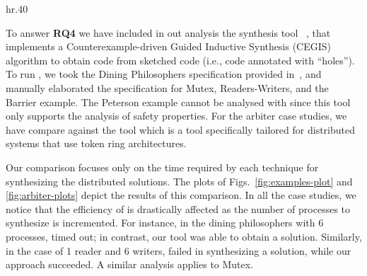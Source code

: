 \begin{wrapfigure}[31]{hr}{.40\textwidth}
\caption{Efficiency comparison for arbiter examples}\label{fig:arbiter-plots}
\end{wrapfigure}
To answer \textbf{RQ4} we have included in out analysis the synthesis tool {\PSketch}~\cite{Solar-Lezama+2008}, that implements a Counterexample-driven Guided Inductive Synthesis (CEGIS) algorithm to obtain code from sketched code (i.e., code annotated with ``holes''). To run {\PSketch}, we took the Dining Philosophers specification provided in~\cite{Solar-Lezama+2008}, and manually elaborated the specification for Mutex,  Readers-Writers, and the Barrier example.  The Peterson example cannot be analysed with  {\PSketch} since this tool only supports the analysis of safety properties.  For the arbiter case studies, we have compare against the tool {\Party} \cite{Party} which is a tool specifically tailored for distributed systems that use token ring architectures.

Our comparison focuses only on the time required by each technique for synthesizing the distributed solutions. The plots of Figs.~\ref{fig:examples-plot} and \ref{fig:arbiter-plots} depict the results of this comparison. In all the case studies, we notice that the efficiency of {\PSketch} is drastically affected as the number of processes to synthesize is incremented. For instance, in the dining philosophers with 6 processes, {\Sketch} timed out; in contrast, our tool was able to obtain a solution. Similarly, in the case of 1 reader and 6 writers, {\PSketch} failed in synthesizing a solution, while our approach succeeded. A similar analysis applies to Mutex.

